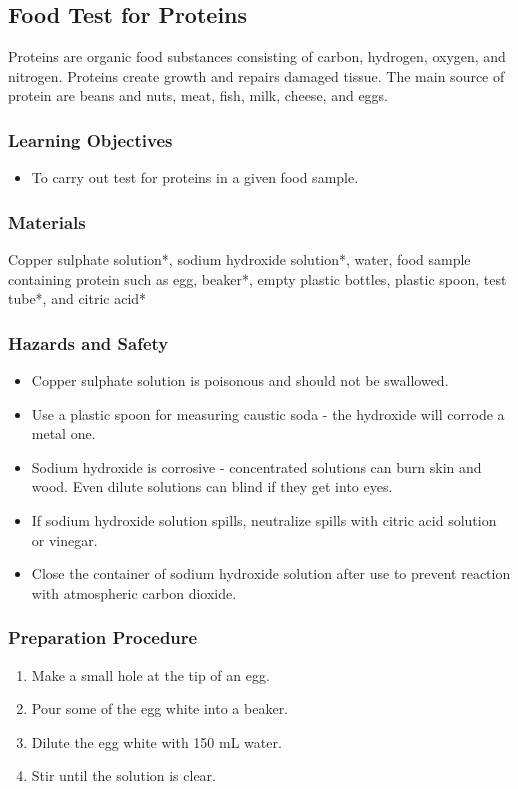 \subsection{Food Test for Proteins}
Proteins are organic food substances consisting of carbon, hydrogen, oxygen, and nitrogen. Proteins create growth and repairs damaged tissue. The main source of protein are beans and nuts, meat, fish, milk, cheese, and eggs.

\subsubsection*{Learning Objectives}
\begin{itemize}
\item{To carry out test for proteins in a given food sample.}
\end{itemize}

\subsubsection*{Materials}
Copper sulphate solution*, sodium hydroxide solution*, water, food sample containing protein such as egg, beaker*, empty plastic bottles, plastic spoon, test tube*, and citric acid*

\subsubsection*{Hazards and Safety}
\begin{itemize}
\item{Copper sulphate solution is poisonous and should not be swallowed.}
\item{Use a plastic spoon for measuring caustic soda - the hydroxide will corrode a metal one.}
\item{Sodium hydroxide is corrosive - concentrated solutions can burn skin and wood. Even dilute solutions can blind if they get into eyes.}
\item{If sodium hydroxide solution spills, neutralize spills with citric acid solution or vinegar.}
\item{Close the container of sodium hydroxide solution after use to prevent reaction with atmospheric carbon dioxide.}
\end{itemize}

\subsubsection*{Preparation Procedure}
\begin{enumerate}
\item{Make a small hole at the tip of an egg.}
\item{Pour some of the egg white into a beaker.}
\item{Dilute the egg white with 150 mL water.}
\item{Stir until the solution is clear.}
\end{enumerate}

